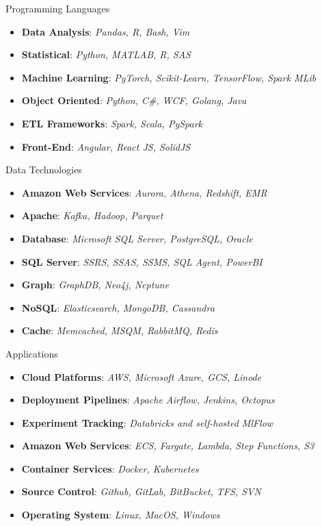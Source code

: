 
\Technology
{Programming Languages}
{\faCode}
{\begin{itemize}
     \item \textbf{Data Analysis}:
       \emph{Pandas, R, Bash, Vim}
     \item \textbf{Statistical}:
       \emph{Python, MATLAB, R, SAS}
     \item \textbf{Machine Learning}:
       \emph{PyTorch, Scikit-Learn, TensorFlow, Spark MLib}
     \item \textbf{Object Oriented}:
       \emph{Python, C\#, WCF, Golang, Java}
     \item \textbf{ETL Frameworks}:
       \emph{Spark, Scala, PySpark}
     \item \textbf{Front-End}:
       \emph{Angular, React JS, SolidJS}
\end{itemize}}

\vspace*{0.01 in}

\Technology
{Data Technologies}
{\faDatabase}
{\begin{itemize}
     \item \textbf{Amazon Web Services}:
       \emph{Aurora, Athena, Redshift, EMR}
     \item \textbf{Apache}:
       \emph{Kafka, Hadoop, Parquet}
     \item \textbf{Database}:
       \emph{Microsoft SQL Server, PostgreSQL, Oracle}
     \item \textbf{SQL Server}:
       \emph{SSRS, SSAS, SSMS, SQL Agent, PowerBI}
     \item \textbf{Graph}:
       \emph{GraphDB, Neo4j, Neptune}
     \item \textbf{NoSQL}:
       \emph{Elasticsearch, MongoDB, Cassandra}
     \item \textbf{Cache}:
       \emph{Memcached, MSQM, RabbitMQ, Redis}
\end{itemize}}

\vspace*{0.01 in}

\Technology
{Applications}
{\faLinux}
{\begin{itemize}
      \item \textbf{Cloud Platforms}:
        \emph{AWS, Microsoft Azure, GCS, Linode}
      \item \textbf{Deployment Pipelines}:
      \emph{Apache Airflow, Jenkins, Octopus}
      \item \textbf{Experiment Tracking}:
        \emph{Databricks and self-hosted MlFlow}
      \item \textbf{Amazon Web Services}:
        \emph{ECS, Fargate, Lambda, Step Functions, S3}
      \item \textbf{Container Services}:
        \emph{Docker, Kubernetes}
      \item \textbf{Source Control}:
        \emph{Github, GitLab, BitBucket, TFS, SVN}
      \item \textbf{Operating System}:
        \emph{Linux, MacOS, Windows}
\end{itemize}}